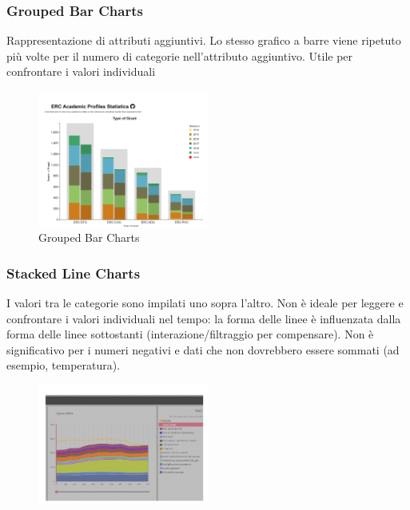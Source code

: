 \subsubsection{Grouped Bar Charts}
Rappresentazione di attributi aggiuntivi. 
Lo stesso grafico a barre viene ripetuto più volte per il numero di categorie nell'attributo aggiuntivo. 
Utile per confrontare i valori individuali
\begin{figure}[H]
    \centering
    \includegraphics[width=0.5\textwidth]{images/GroupedBar.png} 
    \caption{Grouped Bar Charts}
    \label{fig:immagine}
\end{figure}
\subsubsection{Stacked Line Charts}
I valori tra le categorie sono impilati uno sopra l'altro. Non è ideale per leggere e confrontare i valori individuali nel tempo: 
la forma delle linee è influenzata dalla forma delle linee sottostanti (interazione/filtraggio per compensare). 
Non è significativo per i numeri negativi e dati che non dovrebbero essere sommati (ad esempio, temperatura).
\begin{figure}[H]
    \centering
    \includegraphics[width=0.5\textwidth]{images/Stacked.png} 
    \label{fig:immagine}
\end{figure}
